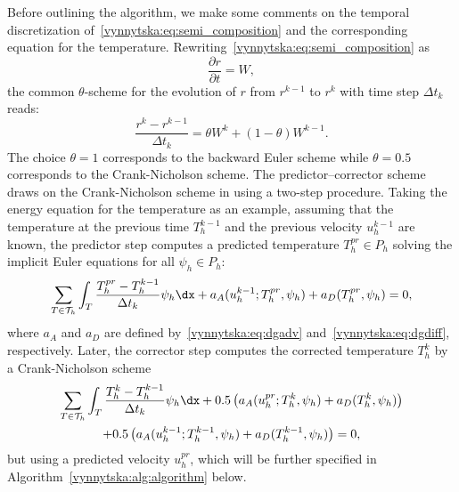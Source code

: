 Before outlining the algorithm, we make some comments on the temporal
discretization of~\eqref{vynnytska:eq:semi_composition}
and the corresponding equation for the
temperature. Rewriting~\eqref{vynnytska:eq:semi_composition} as
\begin{equation}
  \frac{\partial r}{\partial t} = W,
\end{equation}
the common $\theta$-scheme for the evolution of $r$ from $r^{k-1}$ to
$r^k$ with time step $\Delta t_k$ reads:
\begin{equation}
  \label{vynnytska:eq:thetascheme}
  \frac{r^k - r^{k-1}}{\Delta t_k} = \theta W^k + (1 - \theta) W^{k-1}.
\end{equation}
The choice $\theta = 1$ corresponds to the backward Euler scheme
while $\theta = 0.5$ corresponds to the Crank-Nicholson scheme. The
predictor--corrector scheme draws on the Crank-Nicholson scheme in using a
two-step procedure. Taking the energy equation for the temperature as an
example, assuming that the temperature at the previous time $T_h^{k-1}$
and the previous velocity $u_h^{k-1}$ are known, the predictor step
computes a predicted temperature $T_h^{pr} \in P_h$ solving the implicit
Euler equations for all $\psi_h \in P_h$:
\begin{equation}
  \label{vynnytska:eq:predictor}
  \sum_{T \in \mathcal{T}_h}
  \int_T \frac{T_h^{pr} - T_h^{k-1}}{\Delta t_k} \psi_h \dx
  + a_{A} (u_h^{k-1}; T_h^{pr}, \psi_h) + a_D (T_h^{pr}, \psi_h) = 0,
\end{equation}
where $a_A$ and $a_D$ are defined by~\eqref{vynnytska:eq:dgadv}
and~\eqref{vynnytska:eq:dgdiff}, respectively. Later, the corrector
step computes the corrected temperature $T_h^k$ by a Crank-Nicholson
scheme
\begin{multline}
  \label{vynnytska:eq:corrector}
    \sum_{T \in \mathcal{T}_h}
    \int_T \frac{T_h^k - T_h^{k-1}}{\Delta t_k} \psi_h \dx
    + 0.5 \left( a_{A} (u_h^{pr}; T_h^{k}, \psi_h)
    + a_D (T_h^{k}, \psi_h) \right)
\\
    + 0.5 \left( a_{A} (u_h^{k-1}; T_h^{k-1}, \psi_h)
    + a_D (T_h^{k-1}, \psi_h) \right) = 0,
\end{multline}
but using a predicted velocity $u_h^{pr}$, which will be further
specified in Algorithm~\ref{vynnytska:alg:algorithm}
below.
